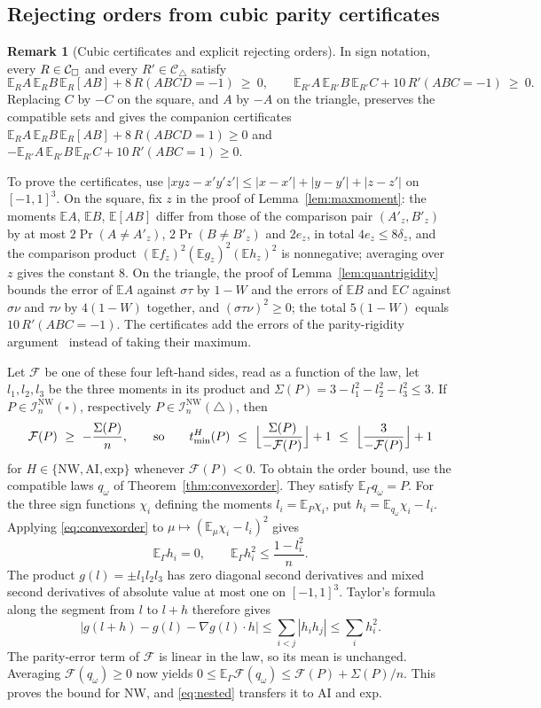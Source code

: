 \documentclass[11pt]{article}
\theoremstyle{plain}
\theoremstyle{definition}
\newtheorem{remark}[theorem]{Remark}
\newcommand{\Ctri}{\mathcal C_{\triangle}}
\newcommand{\INW}{\mathcal I^{\mathrm{NW}}}
\newcommand{\E}{\mathbb E}
\newcommand{\tmin}{t_{\min}}
\begin{document}
\subsection{Rejecting orders from cubic parity certificates}\label{sec:cubicorder}

\begin{remark}[Cubic certificates and explicit rejecting orders]\label{rem:cubicorder}
In sign notation, every $R\in\mathcal C_{\square}$ and every $R'\in\Ctri$ satisfy
\[
\E_RA\,\E_RB\,\E_R[AB]+8\,R(ABCD=-1)\ \ge\ 0,\qquad
\E_{R'}A\,\E_{R'}B\,\E_{R'}C+10\,R'(ABC=-1)\ \ge\ 0 .
\]
Replacing $C$ by $-C$ on the square, and $A$ by $-A$ on the triangle, preserves the compatible sets and gives the companion certificates $\E_RA\,\E_RB\,\E_R[AB]+8\,R(ABCD=1)\ge0$ and $-\E_{R'}A\,\E_{R'}B\,\E_{R'}C+10\,R'(ABC=1)\ge0$.

To prove the certificates, use $|xyz-x'y'z'|\le|x-x'|+|y-y'|+|z-z'|$ on $[-1,1]^3$. On the square, fix $z$ in the proof of Lemma~\ref{lem:maxmoment}: the moments $\E A$, $\E B$, $\E[AB]$ differ from those of the comparison pair $(A'_z,B'_z)$ by at most $2\Pr(A\ne A'_z)$, $2\Pr(B\ne B'_z)$ and $2e_z$, in total $4e_z\le8\delta_z$, and the comparison product $(\E f_z)^2(\E g_z)^2(\E h_z)^2$ is nonnegative; averaging over $z$ gives the constant $8$. On the triangle, the proof of Lemma~\ref{lem:quantrigidity} bounds the error of $\E A$ against $\sigma\tau$ by $1-W$ and the errors of $\E B$ and $\E C$ against $\sigma\nu$ and $\tau\nu$ by $4(1-W)$ together, and $(\sigma\tau\nu)^2\ge0$; the total $5(1-W)$ equals $10\,R'(ABC=-1)$. The certificates add the errors of the parity-rigidity argument~\cite{BoreiriEtAl2023,BoreiriEtAl2025} instead of taking their maximum.

Let $\mathcal F$ be one of these four left-hand sides, read as a function of the law, let $l_1,l_2,l_3$ be the three moments in its product and $\Sigma(P)=3-l_1^2-l_2^2-l_3^2\le3$. If $P\in\INW_n(\square)$, respectively $P\in\INW_n(\triangle)$, then
\[
\mathcal F(P)\ \ge\ -\frac{\Sigma(P)}n,\qquad\text{so}\qquad
\tmin^H(P)\ \le\ \Bigl\lfloor\frac{\Sigma(P)}{-\mathcal F(P)}\Bigr\rfloor+1\ \le\ \Bigl\lfloor\frac3{-\mathcal F(P)}\Bigr\rfloor+1
\]
for $H\in\{\mathrm{NW},\mathrm{AI},\mathrm{exp}\}$ whenever $\mathcal F(P)<0$.
To obtain the order bound, use the compatible laws $q_\omega$ of Theorem~\ref{thm:convexorder}. They satisfy $\E_\Gamma q_\omega=P$. For the three sign functions $\chi_i$ defining the moments $l_i=\E_P\chi_i$, put $h_i=\E_{q_\omega}\chi_i-l_i$. Applying \eqref{eq:convexorder} to $\mu\mapsto(\E_\mu\chi_i-l_i)^2$ gives
\[
\E_\Gamma h_i=0,\qquad \E_\Gamma h_i^2\le\frac{1-l_i^2}{n}.
\]
The product $g(l)=\pm l_1l_2l_3$ has zero diagonal second derivatives and mixed second derivatives of absolute value at most one on $[-1,1]^3$. Taylor's formula along the segment from $l$ to $l+h$ therefore gives
\[
\bigl|g(l+h)-g(l)-\nabla g(l)\cdot h\bigr|
\le\sum_{i<j}|h_ih_j|\le\sum_i h_i^2.
\]
The parity-error term of $\mathcal F$ is linear in the law, so its mean is unchanged. Averaging $\mathcal F(q_\omega)\ge0$ now yields $0\le\E_\Gamma\mathcal F(q_\omega)\le\mathcal F(P)+\Sigma(P)/n$. This proves the bound for NW, and \eqref{eq:nested} transfers it to AI and exp.


\end{remark}
\end{document}
